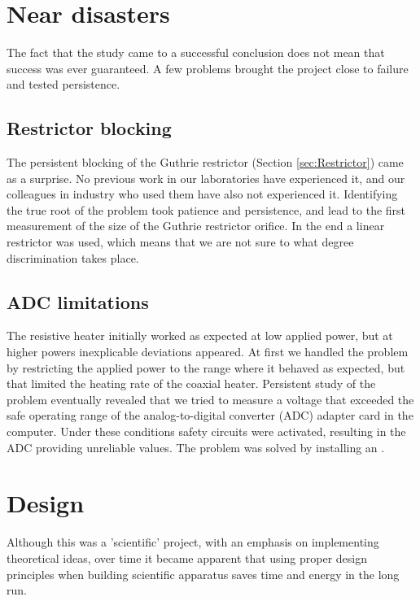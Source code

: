 \section{Near disasters}

The fact that the study came to a successful conclusion does not mean that
success was ever guaranteed. A few problems brought the project close to
failure and tested persistence.

\subsection{Restrictor blocking}

The persistent blocking of the Guthrie restrictor (Section \ref{sec:Restrictor})
came as a surprise. No previous work in our laboratories have experienced it,
and our colleagues in industry who used them have also not experienced it.
Identifying the true root of the problem took patience and persistence, and lead
to the first measurement of the size of the Guthrie restrictor orifice. In the
end a linear restrictor was used, which means that we are not sure to what
degree discrimination takes place.

\subsection{ADC limitations}

The resistive heater initially worked as expected at low applied power, but at
higher powers inexplicable deviations appeared. At first we handled the problem
by restricting the applied power to the range where it behaved as expected, but
that limited the heating rate of the coaxial heater. Persistent study of the
problem eventually revealed that we tried to measure a voltage that exceeded the
safe operating range of the analog-to-digital converter (ADC) adapter card in
the computer. Under these conditions safety circuits were activated, resulting
in the ADC providing unreliable values. The problem was solved by installing an
.


\section{Design}

Although this was a 'scientific' project, with an emphasis on implementing
theoretical ideas, over time it became apparent that using proper design
principles when building scientific apparatus saves time and energy in the long
run.

